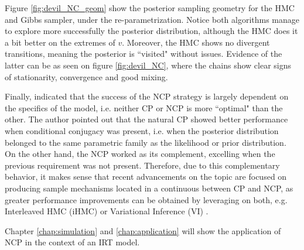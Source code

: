 Figure \ref{fig:devil_NC_geom} show the posterior sampling geometry for the HMC and Gibbs sampler, under the re-parametrization. Notice both algorithms manage to explore more successfully the posterior distribution, although the HMC does it a bit better on the extremes of $v$. Moreover, the HMC shows no divergent transitions, meaning the posterior is ``visited" without issues. Evidence of the latter can be as seen on figure \ref{fig:devil_NC}, where the chains show clear signs of stationarity, convergence and good mixing.

Finally, \citet{Papaspiliopoulos_et_al_2007} indicated that the success of the NCP strategy is largely dependent on the specifics of the model, i.e. neither CP or NCP is more ``optimal" than the other. The author pointed out that the natural CP showed better performance when conditional conjugacy was present, i.e. when the posterior distribution belonged to the same parametric family as the likelihood or prior distribution. On the other hand, the NCP worked as its complement, excelling when the previous requirement was not present. Therefore, due to this complementary behavior, it makes sense that recent advancements on the topic are focused on producing sample mechanisms located in a continuous between CP and NCP, as greater performance improvements can be obtained by leveraging on both, e.g. Interleaved HMC (iHMC) or Variational Inference (VI) \cite{Gelfand_et_al_1995, Gelfand_et_al_1996, Papaspiliopoulos_et_al_2003, Papaspiliopoulos_et_al_2007, Gorinova_et_al_2019}.

Chapter \ref{chap:simulation} and \ref{chap:application} will show the application of NCP in the context of an IRT model.
